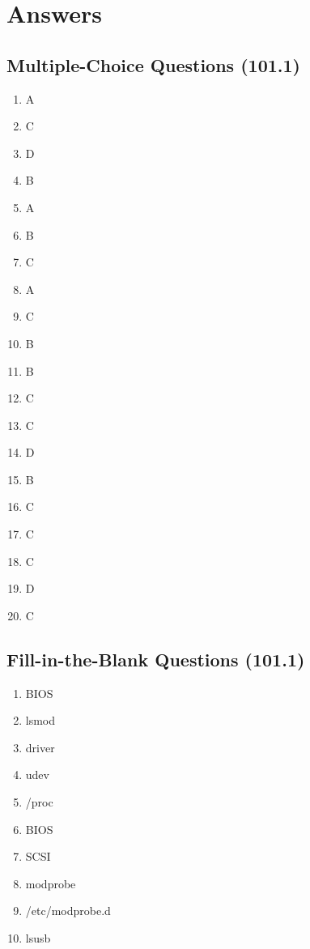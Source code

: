 \documentclass[12pt,a4paper]{report}
\begin{document}
\newpage
\section*{Answers}

\subsection*{Multiple-Choice Questions (101.1)}
\begin{enumerate}[1.]
\item A
\item C
\item D
\item B
\item A
\item B
\item C
\item A
\item C
\item B
\item B
\item C
\item C
\item D
\item B
\item C
\item C
\item C
\item D
\item C
\end{enumerate}

\subsection*{Fill-in-the-Blank Questions (101.1)}
\begin{enumerate}[1.]
\item BIOS
\item lsmod
\item driver
\item udev
\item /proc
\item BIOS
\item SCSI
\item modprobe
\item /etc/modprobe.d
\item lsusb
\end{enumerate}
\end{document}
